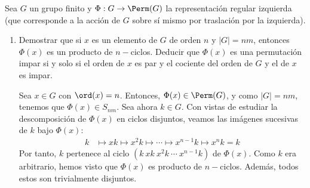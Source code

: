 \begin{ejercicio}
    Sea $G$ un grupo finito y $\Phi: G \to \Perm(G)$ la representación regular izquierda (que corresponde a la acción de $G$ sobre sí mismo por traslación por la izquierda).
    \begin{enumerate}
        \item Demostrar que si $x$ es un elemento de $G$ de orden $n$ y $|G| = nm$, entonces $\Phi(x)$ es un producto de $n-$ciclos. Deducir que $\Phi(x)$ es una permutación impar si y solo si el orden de $x$ es par y el cociente del orden de $G$ y el de $x$ es impar.
        
        Sea $x\in G$ con $\ord(x)=n$. Entonces, $\Phi(x)\in \Perm(G)$, y como $|G|=nm$, tenemos que $\Phi(x)\in S_{nm}$. Sea ahora $k\in G$. Con vistas de estudiar la descomposición de $\Phi(x)$ en ciclos disjuntos, veamos las imágenes sucesivas de $k$ bajo $\Phi(x)$:
        \begin{align*}
            k &\mapsto xk \mapsto x^2k \mapsto \cdots \mapsto x^{n-1}k \mapsto x^n k = k
        \end{align*}
        Por tanto, $k$ pertenece al ciclo $(k\ xk\ x^2k\ \cdots\ x^{n-1}k)$ de $\Phi(x)$. Como $k$ era arbitrario, hemos visto que $\Phi(x)$ es producto de $n-$ciclos. Además, todos estos son trivialmente disjuntos.
        \begin{comment}
        hemos visto que $\Phi(x)$ tiene un ciclo de longitud $n$ que contiene a $k$. Por tanto, para cada $k\in G$, $\Phi(x)$ tiene un ciclo de longitud $n$ que contiene a $k$.
        \begin{itemize}
            \item Supongamos que $\Phi(x)$ tiene un ciclo de longitud $j<n$. Entonces, fijado $g\in G$ perteneciente a dicho ciclo, como el orden de un ciclo es su longitud, tenemos que:
            \begin{equation*}
                g = \Phi^j(g) = x^j g\Longrightarrow x^j = 1
                \Longrightarrow n\mid j
                \Longrightarrow n\leq j
            \end{equation*}
            Por tanto, hemos llegado a una contradicción, luego $\Phi(x)$ no tiene ciclos de longitud $j<n$.
            \item Supongamos que $\Phi(x)$ tiene un ciclo de longitud $j>n$. Entonces:
            \begin{equation*}
                g \neq \Phi^n(g) = x^n g\Longrightarrow x^n \neq 1
            \end{equation*}
            Por tanto, hemos llegado a una contradicción, luego $\Phi(x)$ no tiene ciclos de longitud $j>n$.
        \end{itemize}


\end{comment}
\end{enumerate}
\end{ejercicio}
